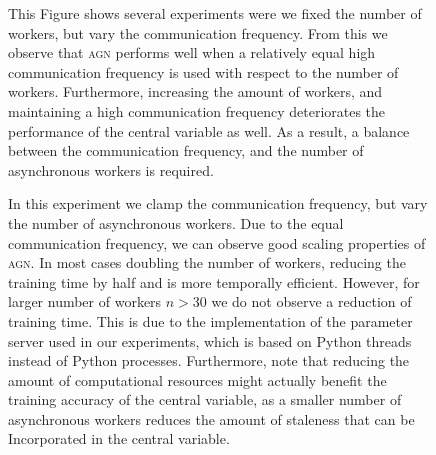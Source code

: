 \documentclass[wcp]{jmlr}
\begin{document}
\begin{figure}
  \centering
  \caption{This Figure shows several experiments were we fixed the number of workers, but vary the communication frequency. From this we observe that \textsc{agn} performs well when a relatively equal high communication frequency is used with respect to the number of workers. Furthermore, increasing the amount of workers, and maintaining a high communication frequency deteriorates the performance of the central variable as well. As a result, a balance between the communication frequency, and the number of asynchronous workers is required.}
  \label{fig:agn_experiments_workers}
\end{figure}

\begin{figure}
  \centering
  \caption{In this experiment we clamp the communication frequency, but vary the number of asynchronous workers. Due to the equal communication frequency, we can observe good scaling properties of \textsc{agn}. In most cases doubling the number of workers, reducing the training time by half and is more temporally efficient. However, for larger number of workers $n > 30$ we do not observe a reduction of training time. This is due to the implementation of the parameter server used in our experiments, which is based on Python threads instead of Python processes. Furthermore, note that reducing the amount of computational resources might actually benefit the training accuracy of the central variable, as a smaller number of asynchronous workers reduces the amount of staleness that can be Incorporated in the central variable.}
  \label{fig:agn_experiments_lambdas}
\end{figure}
\end{document}
